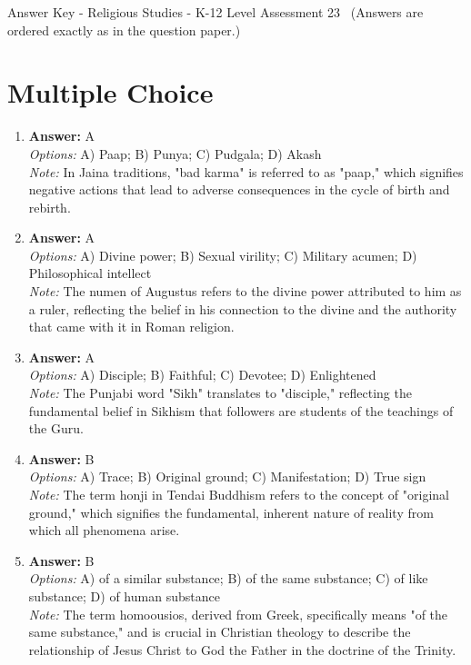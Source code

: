 \documentclass[12pt]{article}
\begin{document}
\begin{center}
Answer Key - Religious Studies - K-12 Level Assessment 23 \
\small (Answers are ordered exactly as in the question paper.)
\end{center}

\section*{Multiple Choice}
\begin{enumerate}[label=\arabic*.]
\item \textbf{Answer:} A
\\ \textit{Options:} A) Paap; B) Punya; C) Pudgala; D) Akash
\\ \textit{Note:} In Jaina traditions, "bad karma" is referred to as "paap," which signifies negative actions that lead to adverse consequences in the cycle of birth and rebirth.
\item \textbf{Answer:} A
\\ \textit{Options:} A) Divine power; B) Sexual virility; C) Military acumen; D) Philosophical intellect
\\ \textit{Note:} The numen of Augustus refers to the divine power attributed to him as a ruler, reflecting the belief in his connection to the divine and the authority that came with it in Roman religion.
\item \textbf{Answer:} A
\\ \textit{Options:} A) Disciple; B) Faithful; C) Devotee; D) Enlightened
\\ \textit{Note:} The Punjabi word "Sikh" translates to "disciple," reflecting the fundamental belief in Sikhism that followers are students of the teachings of the Guru.
\item \textbf{Answer:} B
\\ \textit{Options:} A) Trace; B) Original ground; C) Manifestation; D) True sign
\\ \textit{Note:} The term honji in Tendai Buddhism refers to the concept of "original ground," which signifies the fundamental, inherent nature of reality from which all phenomena arise.
\item \textbf{Answer:} B
\\ \textit{Options:} A) of a similar substance; B) of the same substance; C) of like substance; D) of human substance
\\ \textit{Note:} The term homoousios, derived from Greek, specifically means "of the same substance," and is crucial in Christian theology to describe the relationship of Jesus Christ to God the Father in the doctrine of the Trinity.
\end{enumerate}
\end{document}
